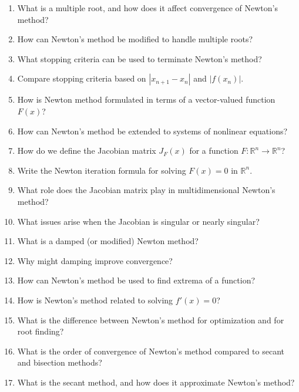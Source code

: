 \begin{enumerate}
\item What is a multiple root, and how does it affect convergence of Newton's method?

\item How can Newton's method be modified to handle multiple roots?

\item What stopping criteria can be used to terminate Newton's method?

\item Compare stopping criteria based on $|x_{n+1} - x_n|$ and $|f(x_n)|$.

\item How is Newton method formulated in terms of a vector-valued function $F(x)$?

\item How can Newton's method be extended to systems of nonlinear equations?

\item How do we define the Jacobian matrix $J_F(x)$ for a function $F : \mathbb{R}^n \to \mathbb{R}^n$?

\item Write the Newton iteration formula for solving $F(x) = 0$ in $\mathbb{R}^n$.

\item What role does the Jacobian matrix play in multidimensional Newton's method?

\item What issues arise when the Jacobian is singular or nearly singular?

\item What is a damped (or modified) Newton method?

\item Why might damping improve convergence?

\item How can Newton's method be used to find extrema of a function?

\item How is Newton's method related to solving $f'(x) = 0$?

\item What is the difference between Newton's method for optimization and for root finding?

\item What is the order of convergence of Newton's method compared to secant and bisection methods?

\item What is the secant method, and how does it approximate Newton's method?


\end{enumerate}
